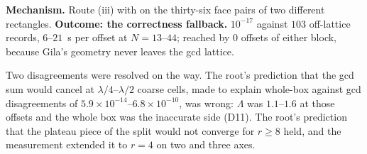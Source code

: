\begin{description}[leftmargin=1.4em]
\item[(u$_4$) The $k$-series on unequal panels.] \textbf{Mechanism.} Route (iii) with
 on the thirty-six face pairs of two different rectangles.
\textbf{Outcome: the correctness fallback.} $10^{-17}$ against $103$ off-lattice records,
$6$--$21$~s per offset at $N = 13$--$44$; reached by $0$ offsets of either block, because
Gila's geometry never leaves the gcd lattice.
\end{description}

\noindent
Two disagreements were resolved on the way. The root's prediction that the gcd sum would
cancel at $\lambda/4$--$\lambda/2$ coarse cells, made to explain whole-box against gcd
disagreements of $5.9\times10^{-14}$--$6.8\times10^{-10}$, was wrong: $\Lambda$ was
$1.1$--$1.6$ at those offsets and the whole box was the inaccurate side (D11). The
root's prediction that the plateau piece of the split would not converge for $r\ge8$ held,
and the measurement extended it to $r = 4$ on two and three axes.
